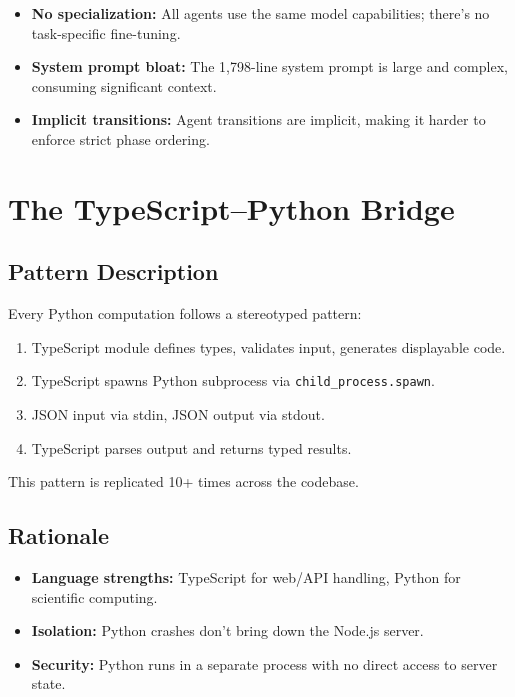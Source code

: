 \begin{itemize}
  \item \textbf{No specialization:} All agents use the same model capabilities; there's no task-specific fine-tuning.
  \item \textbf{System prompt bloat:} The 1,798-line system prompt is large and complex, consuming significant context.
  \item \textbf{Implicit transitions:} Agent transitions are implicit, making it harder to enforce strict phase ordering.
\end{itemize}

\section{The TypeScript--Python Bridge}
\label{sec:patterns:ts-py-bridge}

\subsection{Pattern Description}

Every Python computation follows a stereotyped pattern:
\begin{enumerate}
  \item TypeScript module defines types, validates input, generates displayable code.
  \item TypeScript spawns Python subprocess via \texttt{child\_process.spawn}.
  \item JSON input via stdin, JSON output via stdout.
  \item TypeScript parses output and returns typed results.
\end{enumerate}

This pattern is replicated 10+ times across the codebase.

\subsection{Rationale}

\begin{itemize}
  \item \textbf{Language strengths:} TypeScript for web/API handling, Python for scientific computing.
  \item \textbf{Isolation:} Python crashes don't bring down the Node.js server.
  \item \textbf{Security:} Python runs in a separate process with no direct access to server state.
\end{itemize}

